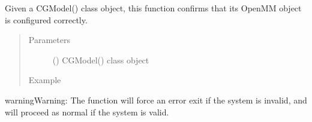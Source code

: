 \documentclass[letterpaper,12pt,english,openany,oneside]{sphinxmanual}
\begin{document}

\begin{fulllineitems}
\label{\detokenize{build:build.cg_build.verify_system}}
Given a CGModel() class object, this function confirms that its OpenMM  object is configured correctly.
\begin{quote}\begin{description}
\item[{Parameters}] \leavevmode
{} () \textendash{} CGModel() class object

\item[{Example}] \leavevmode
\end{description}\end{quote}

\begin{sphinxVerbatim}[commandchars=\\\{\}]
   
  
\end{sphinxVerbatim}

\begin{sphinxadmonition}{warning}{Warning:}
The function will force an error exit if the system is invalid, and will proceed as normal if the system is valid.
\end{sphinxadmonition}

\end{fulllineitems}

\end{document}

